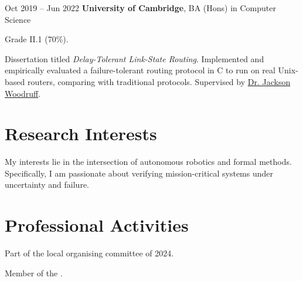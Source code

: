\documentclass[10pt, letterpaper]{article}
\begin{document}
        \begin{twocolentry}{Oct 2019 -- Jun 2022}
            \textbf{University of Cambridge}, BA (Hons) in Computer Science
        \end{twocolentry}
        \vspace{0.10 cm}
        \begin{onecolentry}
            \begin{highlights}
                \item Grade II.1 (70\%).
                \item Dissertation titled \textit{Delay-Tolerant Link-State Routing}. Implemented and empirically evaluated a failure-tolerant routing protocol in C to run on real Unix-based routers, comparing with traditional protocols. Supervised by \href{https://jacksonwoodruff.com/}{Dr. Jackson Woodruff}.
            \end{highlights}
        \end{onecolentry}

    \section{Research Interests}

        My interests lie in the intersection of autonomous robotics and formal methods. Specifically, I am passionate about verifying mission-critical systems under uncertainty and failure.

    \section{Professional Activities}

        \begin{onecolentry}
            \begin{highlights}
                \item Part of the local organising committee of  2024.
                \item Member of the .
            \end{highlights}
        \end{onecolentry}
\end{document}
